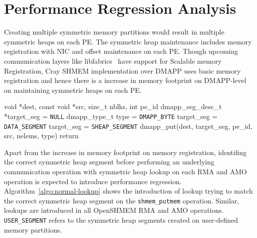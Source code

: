 \section{Performance Regression Analysis}
\label{src:regression}
Creating multiple symmetric memory partitions would result in
multiple symmetric heaps on each PE. The symmetric heap maintenance
includes memory registration with NIC and offset maintenance on
each PE. Though upcoming communication layers like
libfabrics~\cite{libfabrics} have support for Scalable memory
Registration, Cray SHMEM implementation over DMAPP uses basic memory
registration and hence there is a increase in memory footprint on
DMAPP-level on maintaining symmetric heaps on each PE.

\begin{algorithm}[!h]
\begin{algorithmic}
    {void *dest, const void *src, size\_t nblks, int pe\_id}\;
        dmapp\_seg\_desc\_t *target\_seg = \texttt{NULL}\;
        dmapp\_type\_t type = \texttt{DMAPP\_BYTE}\;
         {
            target\_seg = \texttt{DATA\_SEGMENT}\;
        }  {
            target\_seg = \texttt{SHEAP\_SEGMENT}\;
        } 
        dmapp\_put(dest, target\_seg, pe\_id, src, nelems, type)\;
        return\;
    \EndProcedure
    \caption{Lookup logic with N symmetric memory partitions per PE}
    \label{algo:normal-lookup}
\end{algorithmic}
\end{algorithm}

Apart from the increase in memory footprint on memory registration,
identifing the correct symmetric heap segment before performing an
underlying communication operation with symmetric heap lookup on each
RMA and AMO operation is expected to introduce performance
regression. Algorithm~\ref{algo:normal-lookup} shows the introduction
of lookup trying to match the correct symmetric heap segment on the
\texttt{shmem\_putmem} operation. Similar, lookups are introduced in
all OpenSHMEM RMA and AMO operations. \texttt{USER\_SEGMENT} refers to
the symmetric heap segments created on user-defined memory partitions.

